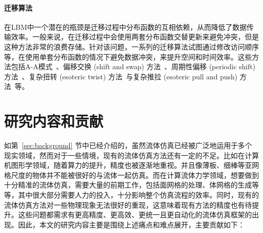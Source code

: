 \paragraph{迁移算法}
在LBM中一个潜在的瓶颈是迁移过程中分布函数的互相依赖，从而降低了数据传输效率。一般来说，在迁移过程中会使用两套分布函数交替更新来避免冲突，但是这种方法非常的浪费存储。针对该问题，一系列的迁移算法试图通过修改访问顺序等，在使用单套分布函数的情况下避免数据冲突，来提升空间和时间效率。这些方法包括A-A模式~\citep{Bailey-2009}、偏移交换 (shift and swap) 方法~\citep{Mohrhard-2019}、周期性偏移 (periodic shift) 方法~\citep{Adrian-2023}、复杂扭转 (esoteric twist) 方法~\citep{Geier-2017-c}与复杂推拉 (esoteric pull and push) 方法~\citep{Moritz-2022}等。

\section{研究内容和贡献}
如第~\ref{sec:background} 节中已经介绍的，虽然流体仿真已经被广泛地运用于多个现实领域，然而对于一些情境，现有的流体仿真方法还有一定的不足。比如在计算机图形学领域，随着算力的提升，精度也被逐渐地重视。并且像薄板、细棒等亚网格尺度的物体并不能被很好的与流体一起仿真。而在计算流体力学领域，想要做到十分精准的流体仿真，需要大量的前期工作，包括面网格的处理、体网格的生成等等，其中很大部分需要人力的投入，十分影响整个仿真流程的效率。同时，现有的流体仿真方法对一些物理现象无法很好的重现，这意味着现有方法的精度也有待提升。这些问题都需求有更高精度、更高效、更统一且更自动化的流体仿真框架的出现。因此，本文的研究内容主要是围绕上述痛点和难点展开，主要贡献如下：

